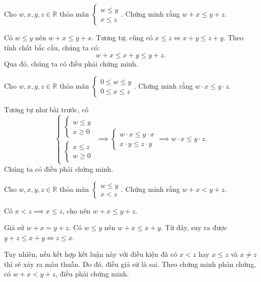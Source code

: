 \exercise Cho $w, x, y, z \in \mathbb{R}$ thỏa mãn $\begin{cases}
   w \le y \\
   x \le z
\end{cases}$. Chứng minh rằng $w + x \le y + z$.

\solution

Có $w \le y$ nên $w + x \le y + x$. Tương tự, cũng có $x \le z \iff x + y \le z + y$. Theo tính chất bắc cầu, chúng ta có:
$$w + x \le x + y \le y + z.$$
Qua đó, chúng ta có điều phải chứng minh.

\exercise Cho $w, x, y, z \in \mathbb{R}$ thỏa mãn $\begin{cases}
   0 \le w \le y \\
   0\le x \le z
\end{cases}$. Chứng minh rằng $w \cdot x \le y\cdot z$.

\solution 

Tương tự như bài trước, có 
$$\begin{cases}
   \begin{cases}
      w \le y \\
      x \geq 0
   \end{cases} \\
   \begin{cases}
      x \le z \\
      w \geq 0
   \end{cases}
\end{cases}\implies \begin{cases}
   w\cdot x \leq y\cdot x \\
   x\cdot y \leq z\cdot y
\end{cases} \implies w\cdot x \le y\cdot z.$$ Chúng ta có điều phải chứng minh.

\exercise Cho $w, x, y, z \in \mathbb{R}$ thỏa mãn $\begin{cases}
   w \le y \\
   x < z
\end{cases}$. Chứng minh rằng $w + x < y + z$.

\solution

Có $x < z \implies x \le z$, cho nên $w + x \le y + z$.

Giả sử $w + x = y + z$. Có $w \le y$ nên $w + x \le x + y$. Từ đây, suy ra được $y + z \le x + y \iff z \le x$. 

Tuy nhiên, nếu kết hợp kết luận này với điều kiện đã có $x < z$ hay $x \le z$ và $x \ne z$ thì sẽ xảy ra mâu thuẫn. Do đó, điều giả sử là sai. Theo chứng minh phản chứng, có $w + x < y + z$, điều phải chứng minh.

